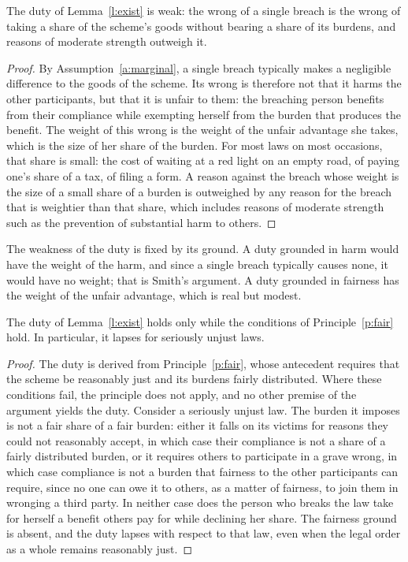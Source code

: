 \documentclass{situationist-preprint}
\begin{document}
\begin{lemma}[Weakness]\label{l:weak}
The duty of Lemma~\ref{l:exist} is weak: the wrong of a single breach is the wrong of taking a share of the scheme's goods without bearing a share of its burdens, and reasons of moderate strength outweigh it.
\end{lemma}

\begin{proof}
By Assumption~\ref{a:marginal}, a single breach typically makes a negligible difference to the goods of the scheme. Its wrong is therefore not that it harms the other participants, but that it is unfair to them: the breaching person benefits from their compliance while exempting herself from the burden that produces the benefit. The weight of this wrong is the weight of the unfair advantage she takes, which is the size of her share of the burden. For most laws on most occasions, that share is small: the cost of waiting at a red light on an empty road, of paying one's share of a tax, of filing a form. A reason against the breach whose weight is the size of a small share of a burden is outweighed by any reason for the breach that is weightier than that share, which includes reasons of moderate strength such as the prevention of substantial harm to others.
\end{proof}

The weakness of the duty is fixed by its ground. A duty grounded in harm would have the weight of the harm, and since a single breach typically causes none, it would have no weight; that is Smith's argument. A duty grounded in fairness has the weight of the unfair advantage, which is real but modest.

\begin{lemma}[Defeasibility]\label{l:defeat}
The duty of Lemma~\ref{l:exist} holds only while the conditions of Principle~\ref{p:fair} hold. In particular, it lapses for seriously unjust laws.
\end{lemma}

\begin{proof}
The duty is derived from Principle~\ref{p:fair}, whose antecedent requires that the scheme be reasonably just and its burdens fairly distributed. Where these conditions fail, the principle does not apply, and no other premise of the argument yields the duty. Consider a seriously unjust law. The burden it imposes is not a fair share of a fair burden: either it falls on its victims for reasons they could not reasonably accept, in which case their compliance is not a share of a fairly distributed burden, or it requires others to participate in a grave wrong, in which case compliance is not a burden that fairness to the other participants can require, since no one can owe it to others, as a matter of fairness, to join them in wronging a third party. In neither case does the person who breaks the law take for herself a benefit others pay for while declining her share. The fairness ground is absent, and the duty lapses with respect to that law, even when the legal order as a whole remains reasonably just.
\end{proof}
\end{document}
